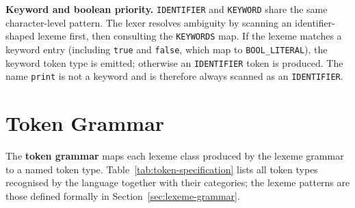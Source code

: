 \noindent\textbf{Keyword and boolean priority.}
\texttt{IDENTIFIER} and \texttt{KEYWORD} share the same character-level
pattern. The lexer resolves ambiguity by scanning an identifier-shaped lexeme
first, then consulting the \texttt{KEYWORDS} map. If the lexeme matches a
keyword entry (including \texttt{true} and \texttt{false}, which map to
\texttt{BOOL\_LITERAL}), the keyword token type is emitted; otherwise an
\texttt{IDENTIFIER} token is produced. The name \texttt{print} is not a
keyword and is therefore always scanned as an \texttt{IDENTIFIER}.

\section{Token Grammar}
\label{sec:token-grammar}
The \textbf{token grammar} maps each lexeme class produced by the lexeme
grammar to a named token type. Table~\ref{tab:token-specification} lists all
token types recognised by the language together with their categories; the
lexeme patterns are those defined formally in
Section~\ref{sec:lexeme-grammar}.

